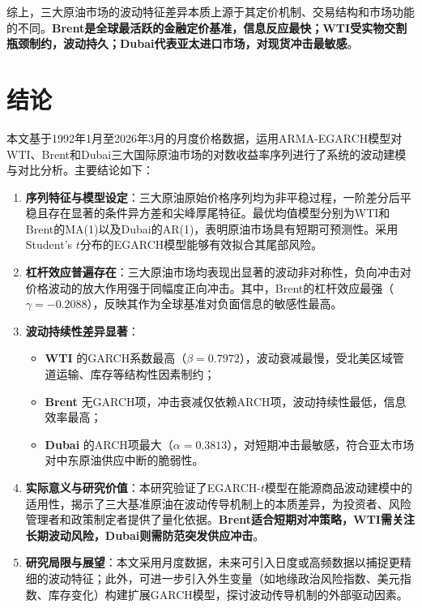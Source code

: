 \documentclass[12pt,a4paper]{ctexart}
\begin{document}
综上，三大原油市场的波动特征差异本质上源于其定价机制、交易结构和市场功能的不同。\textbf{Brent是全球最活跃的金融定价基准，信息反应最快；WTI受实物交割瓶颈制约，波动持久；Dubai代表亚太进口市场，对现货冲击最敏感}。


\newpage
\section{结论}

本文基于1992年1月至2026年3月的月度价格数据，运用ARMA-EGARCH模型对WTI、Brent和Dubai三大国际原油市场的对数收益率序列进行了系统的波动建模与对比分析。主要结论如下：

\begin{enumerate}
\item \textbf{序列特征与模型设定}：三大原油原始价格序列均为非平稳过程，一阶差分后平稳且存在显著的条件异方差和尖峰厚尾特征。最优均值模型分别为WTI和Brent的MA(1)以及Dubai的AR(1)，表明原油市场具有短期可预测性。采用Student's \(t\)分布的EGARCH模型能够有效拟合其尾部风险。

\item \textbf{杠杆效应普遍存在}：三大原油市场均表现出显著的波动非对称性，负向冲击对价格波动的放大作用强于同幅度正向冲击。其中，Brent的杠杆效应最强（\(\gamma=-0.2088\)），反映其作为全球基准对负面信息的敏感性最高。

\item \textbf{波动持续性差异显著}：
\begin{itemize}
\item \textbf{WTI} 的GARCH系数最高（\(\beta=0.7972\)），波动衰减最慢，受北美区域管道运输、库存等结构性因素制约；
\item \textbf{Brent} 无GARCH项，冲击衰减仅依赖ARCH项，波动持续性最低，信息效率最高；
\item \textbf{Dubai} 的ARCH项最大（\(\alpha=0.3813\)），对短期冲击最敏感，符合亚太市场对中东原油供应中断的脆弱性。
\end{itemize}

\item \textbf{实际意义与研究价值}：本研究验证了EGARCH-\(t\)模型在能源商品波动建模中的适用性，揭示了三大基准原油在波动传导机制上的本质差异，为投资者、风险管理者和政策制定者提供了量化依据。\textbf{Brent适合短期对冲策略，WTI需关注长期波动风险，Dubai则需防范突发供应冲击}。

\item \textbf{研究局限与展望}：本文采用月度数据，未来可引入日度或高频数据以捕捉更精细的波动特征；此外，可进一步引入外生变量（如地缘政治风险指数、美元指数、库存变化）构建扩展GARCH模型，探讨波动传导机制的外部驱动因素。
\end{enumerate}






\nocite{*}%
\printbibliography[title={参考文献}]
\end{document}
